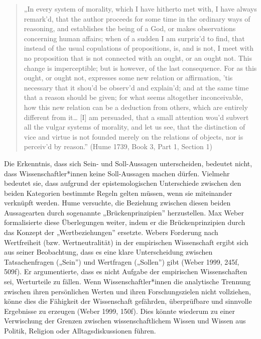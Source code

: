 \documentclass[
  nswissgerman,
  a4paper,
  DIV=11,
  numbers=noendperiod,
  oneside,
  openany]{scrreprt}
\begin{document}
\begin{quote}
„In every system of morality, which I have hitherto met with, I have
always remark'd, that the author proceeds for some time in the ordinary
ways of reasoning, and establishes the being of a God, or makes
observations concerning human affairs; when of a sudden I am surpriz'd
to find, that instead of the usual copulations of propositions, is, and
is not, I meet with no proposition that is not connected with an ought,
or an ought not. This change is imperceptible; but is however, of the
last consequence. For as this ought, or ought not, expresses some new
relation or affirmation, 'tis necessary that it shou'd be observ'd and
explain'd; and at the same time that a reason should be given; for what
seems altogether inconceivable, how this new relation can be a deduction
from others, which are entirely different from it\ldots{} {[}I{]} am
persuaded, that a small attention wou'd subvert all the vulgar systems
of morality, and let us see, that the distinction of vice and virtue is
not founded merely on the relations of objects, nor is perceiv'd by
reason.'' (Hume 1739, Book 3, Part 1, Section 1)
\end{quote}

Die Erkenntnis, dass sich Sein- und Soll-Aussagen unterscheiden,
bedeutet nicht, dass Wissenschaftler*innen keine Soll-Aussagen machen
dürfen. Vielmehr bedeutet sie, dass aufgrund der epistemologischen
Unterschiede zwischen den beiden Kategorien bestimmte Regeln gelten
müssen, wenn sie miteinander verknüpft werden. Hume versuchte, die
Beziehung zwischen diesen beiden Aussagearten durch sogenannte
„Brückenprinzipien'' herzustellen. Max Weber formalisierte diese
Überlegungen weiter, indem er die Brückenprinzipien durch das Konzept
der „Wertbeziehungen'' ersetzte. Webers Forderung nach Wertfreiheit
(bzw. Wertneutralität) in der empirischen Wissenschaft ergibt sich aus
seiner Beobachtung, dass es eine klare Unterscheidung zwischen
Tatsachenfragen („Sein'') und Wertfragen („Sollen'') gibt (Weber 1999,
245f, 509f). Er argumentierte, dass es nicht Aufgabe der empirischen
Wissenschaften sei, Werturteile zu fällen. Wenn Wissenschaftler*innen
die analytische Trennung zwischen ihren persönlichen Werten und ihren
Forschungszielen nicht vollziehen, könne dies die Fähigkeit der
Wissenschaft gefährden, überprüfbare und sinnvolle Ergebnisse zu
erzeugen (Weber 1999, 150f). Dies könnte wiederum zu einer Verwischung
der Grenzen zwischen wissenschaftlichem Wissen und Wissen aus Politik,
Religion oder Alltagsdiskussionen führen.
\end{document}
